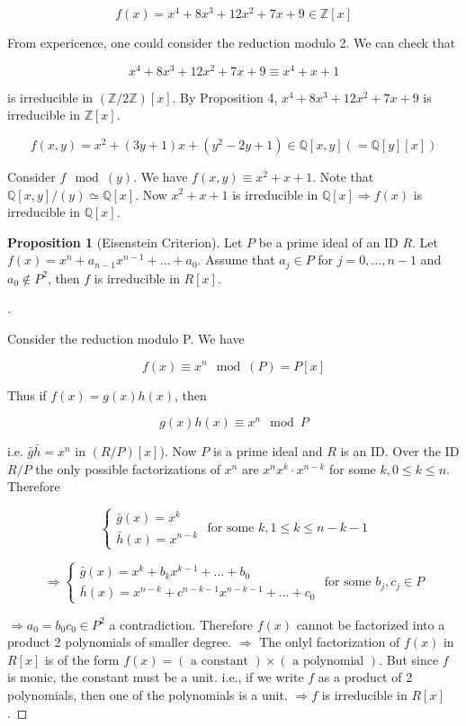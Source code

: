 \documentclass[12pt]{article}
\theoremstyle{definition}
\newtheorem{prop}{Proposition}
\newenvironment{proofs}[1][\proofname]{%
  \begin{proof}[#1]$ $\par\nobreak\ignorespaces
}{%
  \end{proof}
}
\begin{document}
\begin{ex}
	$$f(x) = x^4 + 8 x^3 + 12x^2 + 7x + 9 \in \mathbb{Z}[x]$$

	From expericence, one could consider the reduction modulo 2. We can check that

	$$x^4 + 8x^3 + 12x^2 + 7x + 9 \equiv x^4 + x + 1$$

	is irreducible in $(\mathbb{Z}/2\mathbb{Z})[x]$. By Proposition 4, $x^4 + 8 x^3 + 12 x^2 + 7x + 9$ is irreducible in $\mathbb{Z}[x]$.
\end{ex}

\begin{ex}
	$$f(x, y) = x^2 + (3y + 1)x + (y^2 - 2y + 1) \in \mathbb{Q}[x, y](=\mathbb{Q}[y][x])$$

	Consider $f \mod (y)$. We have $f(x, y) \equiv x^2 + x + 1$. Note that $\mathbb{Q}[x, y]/(y) \simeq \mathbb{Q}[x]$. Now $x^2 + x + 1$ is irreducible in $\mathbb{Q}[x] \Rightarrow f(x)$ is irreducible in $\mathbb{Q}[x]$.
\end{ex}

\begin{prop}[Eisenstein Criterion]
	Let $P$ be a prime ideal of an ID $R$. Let $f(x) = x^n + a_{n - 1}x^{n - 1} + \hdots + a_0$. Assume that $a_j \in P$ for $j = 0, \hdots, n - 1$ and $a_0 \notin P^2$, then $f$ is irreducible in $R[x]$.
\end{prop}

\begin{proofs}
	Consider the reduction modulo P. We have

	$$f(x) \equiv x^n \mod (P)=P[x]$$

	Thus if $f(x) = g(x) h(x)$, then

	$$g(x) h(x) \equiv x^n \mod P$$

	i.e. $\bar{g} \bar{h} = x^n$ in $(R/P)[x]$). Now $P$ is a prime ideal and $R$ is an ID. Over the ID $R/P$ the only possible factorizations of $x^n$ are $x^n  x^k \cdot x^{n - k}$ for some $k, 0 \leq k \leq n$. Therefore

	$$
		\left\{
		\begin{array}{c}
			\bar{g}(x) = x^k \\
			\bar{h}(x) = x^{n - k}
		\end{array}
		\right.
		\text{ for some } k, 1 \leq k \leq n - k - 1
	$$


	$$
		\Rightarrow
		\left\{
		\begin{array}{c}
			\bar{g}(x) = x^k + b_k x^{k - 1} + \hdots + b_0 \\
			\bar{h}(x) = x^{n - k} + c^{n - k - 1} x^{n - k - 1} + \hdots + c_0
		\end{array}
		\right.
		\text{ for some } b_j, c_j \in P
	$$

	$\Rightarrow a_0 = b_0 c_0 \in P^2$ a contradiction. Therefore $f(x)$ cannot be factorized into a product 2 polynomials of smaller degree. $\Rightarrow $ The onlyl factorization of $f(x)$ in $R[x]$ is of the form $f(x) = (\text{ a constant }) \times (\text{ a polynomial })$. But since $f$ is monic, the constant must be a unit. i.e., if we write $f$ as a product of 2 polynomials, then one of the polynomials is a unit. $\Rightarrow f$ is irreducible in $R[x]$.
\end{proofs}
\end{document}
